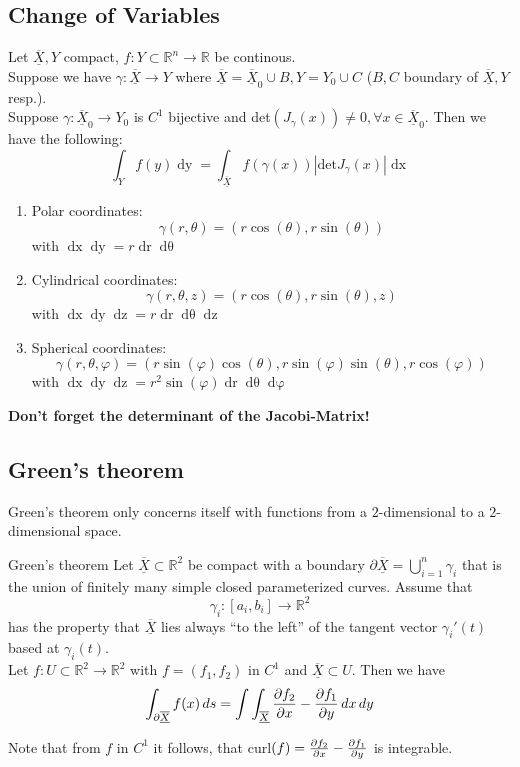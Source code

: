 \documentclass[a4paper,fontsize = 8pt]{scrartcl}
\def\R{\mathbb{R}}
\def\X{\underline{\overline{X}}}
\begin{document}
\subsection{Change of Variables}
Let $\X, Y$ compact, $f: Y \subset \R^n \to \R$ be continous. 
\\Suppose we have $\gamma: \X \to Y$ where $\X = \X_0 \cup B, Y = Y_0 \cup C$ ($B,C$ boundary of $\X,Y$ resp.).
\\Suppose $\gamma: \X_0 \to Y_0$ is $C^1$ bijective and det$(J_\gamma(x)) \neq 0, \forall x \in \X_0$.
Then we have the following:
\[\int_Yf(y)\mathop{dy} = \int_{\X}f(\gamma(x))|\text{det}J_{\gamma}(x)|\mathop{dx}\]

\begin{enumerate}
  \item Polar coordinates: \[\gamma(r, \theta) = (r \cos(\theta), r \sin(\theta))\] with \(\mathop{dx}\mathop{dy} = r \mathop{dr} \mathop{d\theta}\)
  \item Cylindrical coordinates: \[\gamma(r, \theta, z) = (r \cos(\theta), r \sin(\theta), z)\] with \(\mathop{dx} \mathop{dy} \mathop{dz} = r \mathop{dr} \mathop{d\theta} \mathop{dz}\)
  \item Spherical coordinates: \[\gamma(r, \theta, \varphi) = (r\sin(\varphi)\cos(\theta), r \sin(\varphi)\sin(\theta), r \cos(\varphi))\] with \(\mathop{dx}\mathop{dy}\mathop{dz} = r^2 \sin(\varphi) \mathop{dr} \mathop{d\theta} \mathop{d\varphi}\)
\end{enumerate}

\textbf{Don't forget the determinant of the Jacobi-Matrix!}

\subsection{Green's theorem}
Green's theorem only concerns itself with functions from a $2$-dimensional to a $2$-dimensional space. 

\begin{mainbox}{Green's theorem}
  Let $\X \subset \R^2$ be compact with a boundary $\partial \X = \bigcup_{i = 1}^{n}\gamma_i$ that is the union of finitely many simple closed parameterized curves. Assume that 
  \[\gamma_i: [a_i,b_i] \to \R^2\]
  has the property that $\X$ lies always ``to the left'' of the tangent vector $\gamma_i'(t)$ based at $\gamma_i(t)$. 
  \\Let $f: U \subset \R^2 \to \R^2$ with $f = (f_1, f_2)$ in $C^1$ and $\X \subset U$. Then we have
  \[\int_{\partial\X}f(x)\mathop{ds} = \int \int_{\X} \pdv{f_2}{x}-\pdv{f_1}{y} \mathop{dx}\mathop{dy}\]
\end{mainbox}
Note that from $f$ in $C^1$ it follows, that curl$(f) = \pdv{f_2}{x}-\pdv{f_1}{y}$ is integrable.
\end{document}
